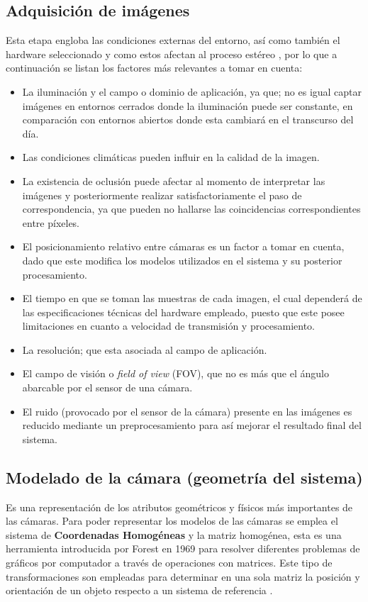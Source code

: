 \subsection{Adquisición de imágenes}
Esta etapa engloba las condiciones externas del entorno, así como también el hardware seleccionado y como estos afectan al proceso estéreo \cite[p.~3]{Barnard1982}, por lo que a continuación se listan los factores más relevantes a tomar en cuenta:
\begin{itemize}
    \item La iluminación y el campo o dominio de aplicación, ya que; no es igual captar imágenes en entornos cerrados donde la iluminación puede ser constante, en comparación con entornos abiertos donde esta cambiará en el transcurso del día.
    \item Las condiciones climáticas pueden influir en la calidad de la imagen.
    \item La existencia de oclusión puede afectar al momento de interpretar las imágenes y posteriormente realizar satisfactoriamente el paso de correspondencia, ya que pueden no hallarse las coincidencias correspondientes entre píxeles.
    \item El posicionamiento relativo entre cámaras es un factor a tomar en cuenta, dado que este modifica los modelos utilizados en el sistema y su posterior procesamiento.
    \item El tiempo en que se toman las muestras de cada imagen, el cual dependerá de las especificaciones técnicas del hardware empleado, puesto que este posee limitaciones en cuanto a velocidad de transmisión y procesamiento.
    \item La resolución; que esta asociada al campo de aplicación.
    \item El campo de visión o \textit{field of view} (FOV), que no es más que el ángulo abarcable por el sensor de una cámara.
    \item El ruido (provocado por el sensor de la cámara) presente en las imágenes es reducido mediante un preprocesamiento para así mejorar el resultado final del sistema. 
\end{itemize}
\subsection{Modelado de la cámara (geometría del sistema)}
Es una representación de los atributos geométricos y físicos más importantes de las cámaras. Para poder representar los modelos de las cámaras se emplea el sistema de \textbf{Coordenadas Homogéneas} y la matriz homogénea, esta es una herramienta introducida por Forest en 1969 para resolver diferentes problemas de gráficos por computador a través de operaciones con matrices. Este tipo de transformaciones son empleadas para determinar en una sola matriz la posición y orientación de un objeto respecto a un sistema de referencia \cite{RSSFernando_homogeneusC}.

